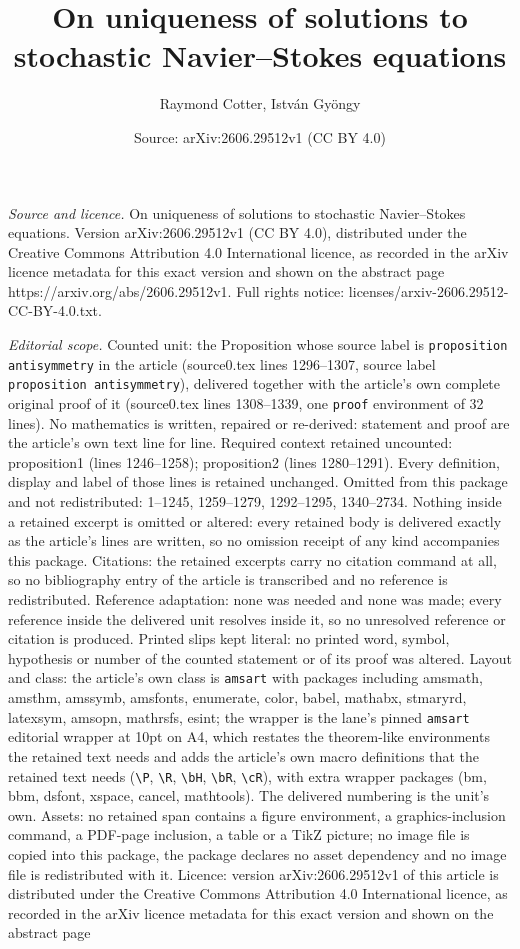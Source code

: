 \documentclass[10pt,a4paper]{amsart}
\title[On uniqueness of solutions to stochastic Navier--Stokes equa]{On uniqueness of solutions to stochastic Navier--Stokes equations}
\author{Raymond Cotter, Istv\'an Gy\"ongy}
\date{Source: arXiv:2606.29512v1 (CC BY 4.0)}
\begin{document}
\maketitle

\noindent\emph{Source and licence.} On uniqueness of solutions to stochastic Navier--Stokes equations. Version arXiv:2606.29512v1 (CC BY 4.0), distributed under the Creative Commons Attribution 4.0 International licence, as recorded in the arXiv licence metadata for this exact version and shown on the abstract page https://arxiv.org/abs/2606.29512v1. Full rights notice: licenses/arxiv-2606.29512-CC-BY-4.0.txt.\par\smallskip

\noindent\textit{Editorial scope.} Counted unit: the Proposition whose source label is \texttt{proposition antisymmetry} in the article (source0.tex lines 1296--1307, source label \texttt{proposition antisymmetry}), delivered together with the article's own complete original proof of it (source0.tex lines 1308--1339, one \texttt{proof} environment of 32 lines). No mathematics is written, repaired or re-derived: statement and proof are the article's own text line for line. Required context retained uncounted: proposition1 (lines 1246--1258); proposition2 (lines 1280--1291). Every definition, display and label of those lines is retained unchanged. Omitted from this package and not redistributed: 1--1245, 1259--1279, 1292--1295, 1340--2734. Nothing inside a retained excerpt is omitted or altered: every retained body is delivered exactly as the article's lines are written, so no omission receipt of any kind accompanies this package. Citations: the retained excerpts carry no citation command at all, so no bibliography entry of the article is transcribed and no reference is redistributed. Reference adaptation: none was needed and none was made; every reference inside the delivered unit resolves inside it, so no unresolved reference or citation is produced. Printed slips kept literal: no printed word, symbol, hypothesis or number of the counted statement or of its proof was altered. Layout and class: the article's own class is \texttt{amsart} with packages including amsmath, amsthm, amssymb, amsfonts, enumerate, color, babel, mathabx, stmaryrd, latexsym, amsopn, mathrsfs, esint; the wrapper is the lane's pinned \texttt{amsart} editorial wrapper at 10pt on A4, which restates the theorem-like environments the retained text needs and adds the article's own macro definitions that the retained text needs (\texttt{\textbackslash P}, \texttt{\textbackslash R}, \texttt{\textbackslash bH}, \texttt{\textbackslash bR}, \texttt{\textbackslash cR}), with extra wrapper packages (bm, bbm, dsfont, xspace, cancel, mathtools). The delivered numbering is the unit's own. Assets: no retained span contains a figure environment, a graphics-inclusion command, a PDF-page inclusion, a table or a TikZ picture; no image file is copied into this package, the package declares no asset dependency and no image file is redistributed with it. Licence: version arXiv:2606.29512v1 of this article is distributed under the Creative Commons Attribution 4.0 International licence, as recorded in the arXiv licence metadata for this exact version and shown on the abstract page 
\end{document}
